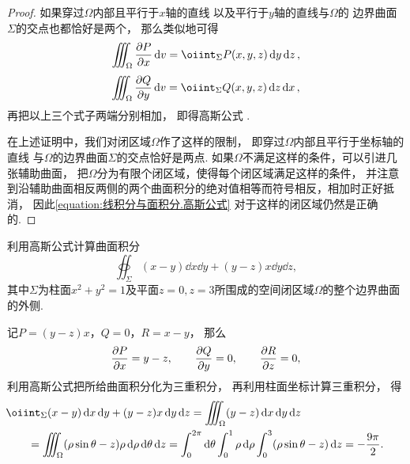 \begin{theorem}
\begin{proof}
如果穿过\(\Omega\)内部且平行于\(x\)轴的直线
以及平行于\(y\)轴的直线与\(\Omega\)的
边界曲面\(\Sigma\)的交点也都恰好是两个，
那么类似地可得\[
	\iiint_\Omega \pdv{P}{x} \dd{v} = \oiint_\Sigma P(x,y,z) \dd{y}\dd{z},
\]\[
	\iiint_\Omega \pdv{Q}{y} \dd{v} = \oiint_\Sigma Q(x,y,z) \dd{z}\dd{x},
\]
再把以上三个式子两端分别相加，
即得高斯公式 .

在上述证明中，我们对闭区域\(\Omega\)作了这样的限制，
即穿过\(\Omega\)内部且平行于坐标轴的直线
与\(\Omega\)的边界曲面\(\Sigma\)的交点恰好是两点.
如果\(\Omega\)不满足这样的条件，可以引进几张辅助曲面，
把\(\Omega\)分为有限个闭区域，使得每个闭区域满足这样的条件，
并注意到沿辅助曲面相反两侧的两个曲面积分的绝对值相等而符号相反，相加时正好抵消，
因此\cref{equation:线积分与面积分.高斯公式} 对于这样的闭区域仍然是正确的.
\end{proof}
\end{theorem}


\begin{example}
利用高斯公式计算曲面积分\[
	\oiint_\Sigma (x-y) \dd{x}\dd{y} + (y-z)x \dd{y}\dd{z},
\]
其中\(\Sigma\)为柱面\(x^2+y^2=1\)及平面\(z=0,z=3\)所围成的空间闭区域\(\Omega\)的整个边界曲面的外侧.
\begin{solution}
记\(P=(y-z)x\)，\(Q=0\)，\(R=x-y\)，
那么\[
	\pdv{P}{x} = y-z,
	\qquad
	\pdv{Q}{y} = 0,
	\qquad
	\pdv{R}{z} = 0,
\]
利用高斯公式把所给曲面积分化为三重积分，
再利用柱面坐标计算三重积分，
得\begin{align*}
	&\hspace{-20pt}\oiint_\Sigma (x-y) \dd{x}\dd{y} + (y-z)x \dd{y}\dd{z}
	= \iiint_\Omega (y-z) \dd{x}\dd{y}\dd{z} \\
	&= \iiint_\Omega (\rho\sin\theta-z)\rho\dd{\rho}\dd{\theta}\dd{z}
	= \int_0^{2\pi} \dd{\theta} \int_0^1 \rho\dd{\rho} \int_0^3 (\rho\sin\theta-z) \dd{z}
	= -\frac{9\pi}{2}.
\end{align*}
\end{solution}
\end{example}


